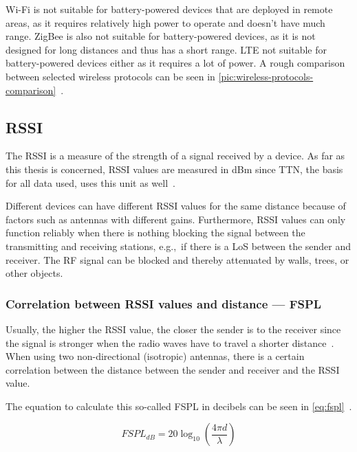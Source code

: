 Wi-Fi is not suitable for battery-powered devices that are deployed in remote areas, as it requires relatively high power to operate and doesn't have much range.
ZigBee is also not suitable for battery-powered devices, as it is not designed for long distances and thus has a short range.
\ac{LTE} not suitable for battery-powered devices either as it requires a lot of power.
A rough comparison between selected wireless protocols can be seen in \cref{pic:wireless-protocols-comparison}~\cite{wang_comparison_2021}.

\subsection{\acf{RSSI}}\label{sec:rssi}

The \acl{RSSI} is a measure of the strength of a signal received by a device.
As far as this thesis is concerned, \ac{RSSI} values are measured in dBm since \ac{TTN}, the basis for all data used, uses this unit as well~\cite{the_things_industries_bv_data_2023}.

Different devices can have different \ac{RSSI} values for the same distance because of factors such as antennas with different gains.
Furthermore, \ac{RSSI} values can only function reliably when there is nothing blocking the signal between the transmitting and receiving stations, e.g.,\ if there is a \ac{LoS} between the sender and receiver.
The \ac{RF} signal can be blocked and thereby attenuated by walls, trees, or other objects.

\subsubsection{Correlation between \acs{RSSI} values and distance --- \acf{FSPL}}\label{sec:background-free-space-path-loss}

Usually, the higher the \ac{RSSI} value, the closer the sender is to the receiver since the signal is stronger when the radio waves have to travel a shorter distance~\cite{stutzman_antenna_1981}.
When using two non-directional (isotropic) antennas, there is a certain correlation between the distance between the sender and receiver and the \ac{RSSI} value.

The equation to calculate this so-called \acl{FSPL} in decibels can be seen in \cref{eq:fspl}~\cite[p. 1321]{whitaker_electronics_1996}.

\begin{equation}\label{eq:fspl}
    FSPL_{dB} = 20 \log_{10}\left(\frac{4 \pi d}{\lambda}\right)
\end{equation}

